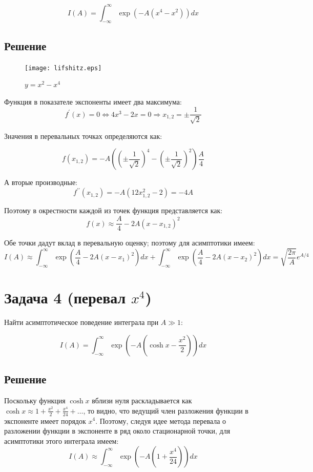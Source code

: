 \documentclass[a4paper,12pt]{article}
\begin{document}
\[
I(A)=\int_{-\infty}^{\infty}\exp(-A(x^{4}-x^{2}))dx
\]



\subsection{Решение}

\begin{figure}[h]
	\caption{$y=x^{2}-x^{4}$}
	\centering
	\texttt{[image: lifshitz.eps]}
\end{figure}

\noindent
Функция в показателе экспоненты имеет два максимума: 
\[
f^{\prime}(x)=0\Leftrightarrow4x^{3}-2x=0\Rightarrow x_{1,2}=\pm\frac{1}{\sqrt{2}}
\]

\noindent
Значения в перевальных точках определяются как:

\[
f(x_{1,2})=-A\left(\left(\pm\frac{1}{\sqrt{2}}\right)^{4}-\left(\pm\frac{1}{\sqrt{2}}\right)^{2}\right)\frac{A}{4}
\]

\noindent
А вторые производные:
\[
f^{\prime\prime}(x_{1,2})=-A(12x_{1,2}^{2}-2)=-4A
\]

\noindent
Поэтому в окрестности каждой из точек функция представляется как:
\[
f(x)\approx\frac{A}{4}-2A(x-x_{1,2})^{2}
\]

\noindent
Обе точки дадут вклад в перевальную оценку; поэтому для асимптотики
имеем:
\[
I\left(A\right)\approx\int_{-\infty}^{\infty}\exp\left(\frac{A}{4}-2A(x-x_{1})^{2}\right)dx+\int_{-\infty}^{\infty}\exp\left(\frac{A}{4}-2A(x-x_{2})^{2}\right)dx=\sqrt{\frac{2\pi}{A}}e^{A/4}
\]



\section{Задача 4 (перевал $x^4$)}

Найти асимптотическое поведение интеграла при $A\gg1$:

\[
I\left(A\right)=\int_{-\infty}^{\infty}\exp\left(-A\left(\cosh x-\frac{x^{2}}{2}\right)\right)dx
\]



\subsection{Решение}

Поскольку функция $\cosh x$ вблизи нуля раскладывается как $\cosh x\approx1+\frac{x^{2}}{2}+\frac{x^{4}}{24}+\dots$,
то видно, что ведущий член разложения функции в экспоненте имеет порядок
$x^{4}$. Поэтому, следуя идее метода перевала о разложении функции
в экспоненте в ряд около стационарной точки, для асимптотики этого
интеграла имеем:
\[
I(A)\approx\int_{-\infty}^{\infty}\exp\left(-A\left(1+\frac{x^{4}}{24}\right)\right)dx
\]
\end{document}
